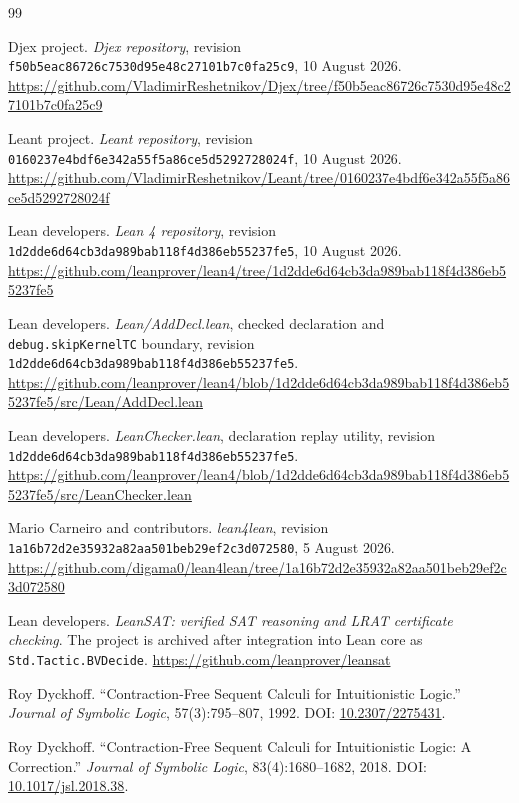 \documentclass[11pt,letterpaper,openany]{report}
\theoremstyle{definition}
\theoremstyle{remark}
\newcommand{\code}[1]{\texttt{#1}}
\newcommand{\commit}[1]{\texttt{\small #1}}
\begin{document}
\begin{thebibliography}{99}

Djex project.
\emph{Djex repository}, revision
\commit{f50b5eac86726c7530d95e48c27101b7c0fa25c9}, 10 August 2026.
\url{https://github.com/VladimirReshetnikov/Djex/tree/f50b5eac86726c7530d95e48c27101b7c0fa25c9}

Leant project.
\emph{Leant repository}, revision
\commit{0160237e4bdf6e342a55f5a86ce5d5292728024f}, 10 August 2026.
\url{https://github.com/VladimirReshetnikov/Leant/tree/0160237e4bdf6e342a55f5a86ce5d5292728024f}

Lean developers.
\emph{Lean 4 repository}, revision
\commit{1d2dde6d64cb3da989bab118f4d386eb55237fe5}, 10 August 2026.
\url{https://github.com/leanprover/lean4/tree/1d2dde6d64cb3da989bab118f4d386eb55237fe5}

Lean developers.
\emph{Lean/AddDecl.lean}, checked declaration and \code{debug.skipKernelTC} boundary, revision
\commit{1d2dde6d64cb3da989bab118f4d386eb55237fe5}.
\url{https://github.com/leanprover/lean4/blob/1d2dde6d64cb3da989bab118f4d386eb55237fe5/src/Lean/AddDecl.lean}

Lean developers.
\emph{LeanChecker.lean}, declaration replay utility, revision
\commit{1d2dde6d64cb3da989bab118f4d386eb55237fe5}.
\url{https://github.com/leanprover/lean4/blob/1d2dde6d64cb3da989bab118f4d386eb55237fe5/src/LeanChecker.lean}

Mario Carneiro and contributors.
\emph{lean4lean}, revision
\commit{1a16b72d2e35932a82aa501beb29ef2c3d072580}, 5 August 2026.
\url{https://github.com/digama0/lean4lean/tree/1a16b72d2e35932a82aa501beb29ef2c3d072580}

Lean developers.
\emph{LeanSAT: verified SAT reasoning and LRAT certificate checking}.
The project is archived after integration into Lean core as \code{Std.Tactic.BVDecide}.
\url{https://github.com/leanprover/leansat}

Roy Dyckhoff.
``Contraction-Free Sequent Calculi for Intuitionistic Logic.''
\emph{Journal of Symbolic Logic}, 57(3):795--807, 1992.
DOI: \href{https://doi.org/10.2307/2275431}{10.2307/2275431}.

Roy Dyckhoff.
``Contraction-Free Sequent Calculi for Intuitionistic Logic: A Correction.''
\emph{Journal of Symbolic Logic}, 83(4):1680--1682, 2018.
DOI: \href{https://doi.org/10.1017/jsl.2018.38}{10.1017/jsl.2018.38}.


\end{thebibliography}
\end{document}
